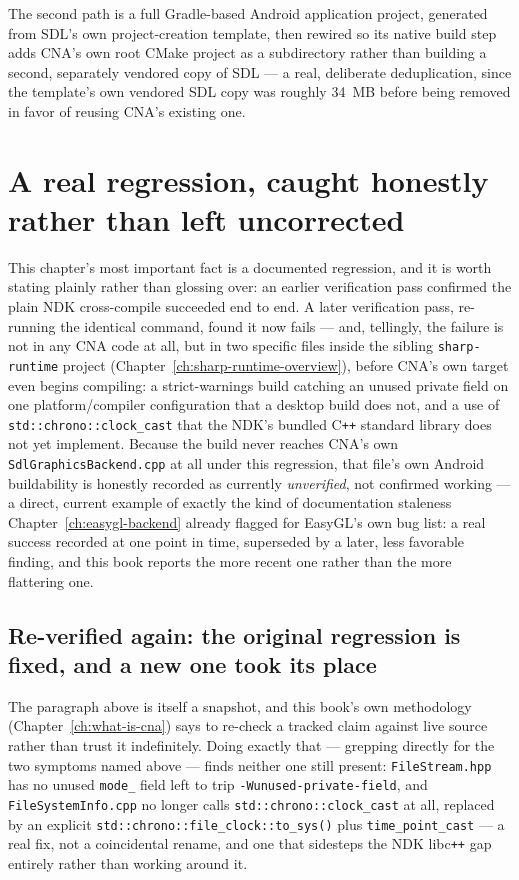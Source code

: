 The second path is a full Gradle-based Android application project, generated from SDL's own
project-creation template, then rewired so its native build step adds CNA's own root CMake
project as a subdirectory rather than building a second, separately vendored copy of SDL ---
a real, deliberate deduplication, since the template's own vendored SDL copy was roughly
34~MB before being removed in favor of reusing CNA's existing one.

\section{A real regression, caught honestly rather than left uncorrected}

This chapter's most important fact is a documented regression, and it is worth stating
plainly rather than glossing over: an earlier verification pass confirmed the plain
NDK cross-compile succeeded end to end. A later verification pass, re-running the identical
command, found it now fails --- and, tellingly, the failure is not in any CNA code at all,
but in two specific files inside the sibling \texttt{sharp-runtime} project
(Chapter~\ref{ch:sharp-runtime-overview}), before CNA's own target even begins compiling: a
strict-warnings build catching an unused private field on one platform/compiler
configuration that a desktop build does not, and a use of
\texttt{std::chrono::clock\_cast} that the NDK's bundled C\texttt{++} standard library does
not yet implement. Because the build never reaches CNA's own \texttt{SdlGraphicsBackend.cpp}
at all under this regression, that file's own Android buildability is honestly recorded as
currently \emph{unverified}, not confirmed working --- a direct, current example of exactly
the kind of documentation staleness Chapter~\ref{ch:easygl-backend} already flagged for
EasyGL's own bug list: a real success recorded at one point in time, superseded by a later,
less favorable finding, and this book reports the more recent one rather than the more
flattering one.

\subsection{Re-verified again: the original regression is fixed, and a new one took its place}

The paragraph above is itself a snapshot, and this book's own methodology (Chapter~\ref{ch:what-is-cna})
says to re-check a tracked claim against live source rather than trust it indefinitely. Doing
exactly that --- grepping  directly for the two symptoms named above ---
finds neither one still present: \texttt{FileStream.hpp} has no unused \texttt{mode\_} field
left to trip \texttt{-Wunused-private-field}, and \texttt{FileSystemInfo.cpp} no longer calls
\texttt{std::chrono::clock\_cast} at all, replaced by an explicit
\texttt{std::chrono::file\_clock::to\_sys()} plus \texttt{time\_point\_cast} --- a real fix,
not a coincidental rename, and one that sidesteps the NDK libc\texttt{++} gap entirely rather
than working around it.

